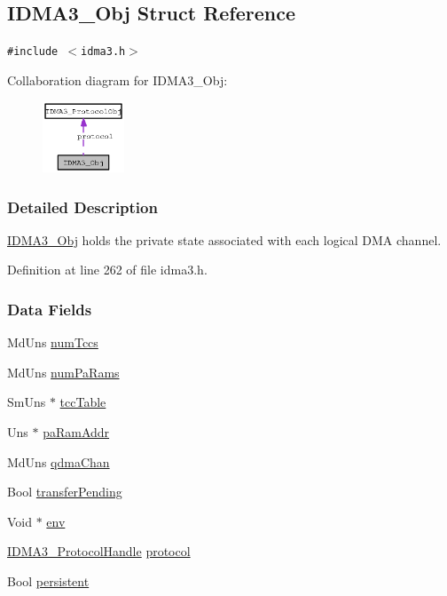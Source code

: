 \hypertarget{struct_i_d_m_a3___obj}{
\subsection{IDMA3\_\-Obj Struct Reference}
\label{struct_i_d_m_a3___obj}
}
{\tt \#include $<$idma3.h$>$}

Collaboration diagram for IDMA3\_\-Obj:\begin{figure}[H]
\begin{center}
\leavevmode
\includegraphics[width=69pt]{struct_i_d_m_a3___obj__coll__graph}
\end{center}
\end{figure}


\subsubsection{Detailed Description}
\hyperlink{struct_i_d_m_a3___obj}{IDMA3\_\-Obj} holds the private state associated with each logical DMA channel. 



Definition at line 262 of file idma3.h.\subsubsection*{Data Fields}
\begin{CompactItemize}
\item 
Md\-Uns \hyperlink{struct_i_d_m_a3___obj_b9079f0696a344a620ea6d619a6e3d27}{num\-Tccs}
\item 
Md\-Uns \hyperlink{struct_i_d_m_a3___obj_0448d6e17a54dd815b41da25363b5ff2}{num\-Pa\-Rams}
\item 
Sm\-Uns $\ast$ \hyperlink{struct_i_d_m_a3___obj_de71e2d4ba3121cdb5c621a8749d51c3}{tcc\-Table}
\item 
Uns $\ast$ \hyperlink{struct_i_d_m_a3___obj_61e6a45019fbc04e526cdd8cadbb6d59}{pa\-Ram\-Addr}
\item 
Md\-Uns \hyperlink{struct_i_d_m_a3___obj_fd4af47b5c6adf5d99702f4b290019dd}{qdma\-Chan}
\item 
Bool \hyperlink{struct_i_d_m_a3___obj_95914721dbaef8bce045253b0cb81468}{transfer\-Pending}
\item 
Void $\ast$ \hyperlink{struct_i_d_m_a3___obj_900c29cb46bab73d88002d88a5ca41a0}{env}
\item 
\hyperlink{struct_i_d_m_a3___protocol_obj}{IDMA3\_\-Protocol\-Handle} \hyperlink{struct_i_d_m_a3___obj_74d1aa95d8583438686b86229a33a429}{protocol}
\item 
Bool \hyperlink{struct_i_d_m_a3___obj_a45d155055413e89a97d98744809ee12}{persistent}
\end{CompactItemize}


